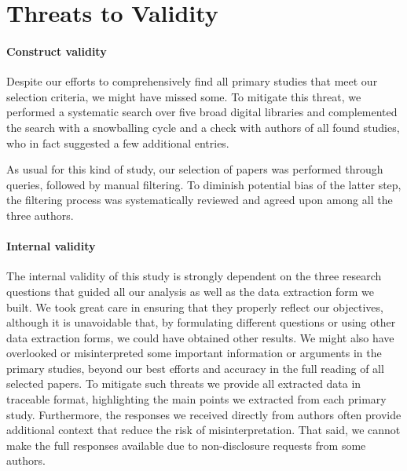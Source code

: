 \section{Threats to Validity}
\label{sec:lit_threats}

\paragraph{Construct validity} Despite our efforts to comprehensively find all primary studies that meet our selection criteria, we might have missed some.
To mitigate this threat, we performed a systematic search over five broad digital libraries and complemented the search with a snowballing cycle and a check with authors of all found studies, who in fact suggested a few additional entries.

As usual for this kind of study, our selection of papers was performed through queries, followed by manual filtering.
To diminish potential bias of the latter step, the filtering process was systematically reviewed and agreed upon among all the three authors.

\paragraph{Internal validity} The internal validity of this study is strongly dependent on the three research questions that guided all our analysis as well as the data extraction form we  built.
We took great care in ensuring that they properly reflect our objectives, although it is unavoidable that, by formulating  different questions or using other data extraction forms, we could have obtained other results.
We might also have overlooked or misinterpreted some important information or arguments in the primary studies, beyond our best efforts and accuracy in the full reading of all selected papers.
To mitigate such threats we provide all extracted data in traceable format, highlighting the main points we extracted from each primary study.
Furthermore, the responses we received directly from authors often provide additional context that reduce the risk of misinterpretation.
That said, we cannot make the full responses available due to non-disclosure requests from some authors.

